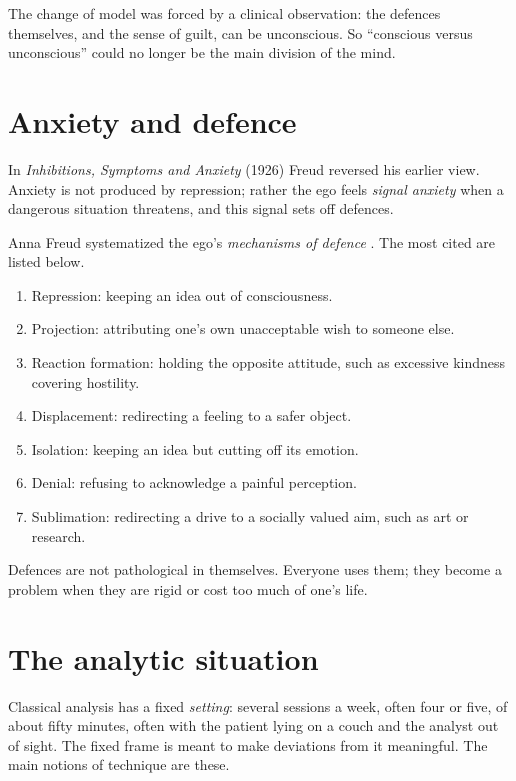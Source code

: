 The change of model was forced by a
clinical observation: the defences
themselves, and the sense of guilt, can
be unconscious. So ``conscious versus
unconscious'' could no longer be the
main division of the mind.

\section{Anxiety and defence}
\label{section-anxiety-defence}

In \emph{Inhibitions, Symptoms and
Anxiety} (1926)
\cite{freud-se-20-anxiety} Freud
reversed his earlier view. Anxiety is
not produced by repression; rather the
ego feels \emph{signal anxiety} when a
dangerous situation threatens, and this
signal sets off defences.

Anna Freud systematized the ego's
\emph{mechanisms of defence}
\cite{anna-freud-ego-defence}. The most
cited are listed below.

\begin{enumerate}
\item Repression: keeping an idea out
of consciousness.
\item Projection: attributing one's own
unacceptable wish to someone else.
\item Reaction formation: holding the
opposite attitude, such as excessive
kindness covering hostility.
\item Displacement: redirecting a
feeling to a safer object.
\item Isolation: keeping an idea but
cutting off its emotion.
\item Denial: refusing to acknowledge a
painful perception.
\item Sublimation: redirecting a drive
to a socially valued aim, such as art
or research.
\end{enumerate}

Defences are not pathological in
themselves. Everyone uses them; they
become a problem when they are rigid or
cost too much of one's life.

\section{The analytic situation}
\label{section-analytic-situation}

Classical analysis has a fixed
\emph{setting}: several sessions a week,
often four or five, of about fifty
minutes, often with the patient lying
on a couch and the analyst out of
sight. The fixed frame is meant to make
deviations from it meaningful. The main
notions of technique are these.

